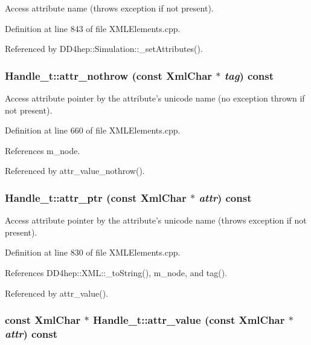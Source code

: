Access attribute name (throws exception if not present). 

Definition at line 843 of file XMLElements.cpp.

Referenced by DD4hep::Simulation::\_\-setAttributes().\hypertarget{class_d_d4hep_1_1_x_m_l_1_1_handle__t_a3975488eca8248e5ec37857107206ffd}{
\subsubsection[{attr\_\-nothrow}]{ Handle\_\-t::attr\_\-nothrow (const {\bf XmlChar} $\ast$ {\em tag}) const}}
\label{class_d_d4hep_1_1_x_m_l_1_1_handle__t_a3975488eca8248e5ec37857107206ffd}


Access attribute pointer by the attribute's unicode name (no exception thrown if not present). 

Definition at line 660 of file XMLElements.cpp.

References m\_\-node.

Referenced by attr\_\-value\_\-nothrow().\hypertarget{class_d_d4hep_1_1_x_m_l_1_1_handle__t_abab559d23f0817f14d66172c641d6c50}{
\subsubsection[{attr\_\-ptr}]{ Handle\_\-t::attr\_\-ptr (const {\bf XmlChar} $\ast$ {\em attr}) const}}
\label{class_d_d4hep_1_1_x_m_l_1_1_handle__t_abab559d23f0817f14d66172c641d6c50}


Access attribute pointer by the attribute's unicode name (throws exception if not present). 

Definition at line 830 of file XMLElements.cpp.

References DD4hep::XML::\_\-toString(), m\_\-node, and tag().

Referenced by attr\_\-value().\hypertarget{class_d_d4hep_1_1_x_m_l_1_1_handle__t_a192be5b3194575830942910f8f671589}{
\subsubsection[{attr\_\-value}]{\setlength{\rightskip}{0pt plus 5cm}const {\bf XmlChar} $\ast$ Handle\_\-t::attr\_\-value (const {\bf XmlChar} $\ast$ {\em attr}) const}}
\label{class_d_d4hep_1_1_x_m_l_1_1_handle__t_a192be5b3194575830942910f8f671589}


